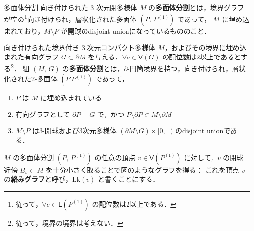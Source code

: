 \documentclass[TQFT_main]{subfiles}
\begin{document}
\begin{mydef}[label=def:polytope-decomp]{多面体分割}
    向き付けられた $3$ 次元閉多様体 $M$ の\textbf{多面体分割}とは，\hyperref[def:graph-bdy]{境界グラフ}が空の\footnote{従って，$\forall e \in \mathsf{E}(P^{(1)})$ の配位数は2以上である．}\hyperref[def:polyhedron]{向き付けられ，層状化された多面体} $(P,\, P^{(1)})$ であって，
    $M$ に埋め込まれており，$M \setminus P$ が開球のdisjoint unionになっているもののこと． 
    
    \tcblower

    向き付けられた境界付き $3$ 次元コンパクト多様体 $M$，およびその境界に埋め込まれた有向グラフ $G \subset \partial M$ を与える．$\forall v \in \mathsf{V}(G)$ の\hyperref[def:polyhedron]{配位数}は2以上であるとする\footnote{従って，境界の境界は考えない．}．
    組 $(M,\, G)$ の\textbf{多面体分割}とは，\hyperref[def:graph-bdy]{$\partial$-円筒境界を持つ}，\hyperref[def:polyhedron]{向き付けられ，層状化された2-多面体} $(P\, P^{(1)})$ であって，
    \begin{enumerate}
        \item $P$ は $M$ に埋め込まれている
        \item 有向グラフとして $\partial P = G$ で，かつ $P \setminus \partial P \subset M \setminus \partial M$
        \item $M \setminus P$ は3-開球および3次元多様体 $(\partial M \setminus G) \times [0,\, 1)$ のdisjoint unionである．
    \end{enumerate}
    
\end{mydef}

$M$ の多面体分割 $(P,\, P^{(1)})$ の任意の頂点 $v \in \mathsf{V}(P^{(1)})$ に対して，$v$ の閉球近傍 $B_v \subset M$ を十分小さく取ることで図のようなグラフを得る：
これを頂点 $v$ の\textbf{絡みグラフ}と呼び，$\mathrm{Lk}(v)$ と書くことにする．
\end{document}
